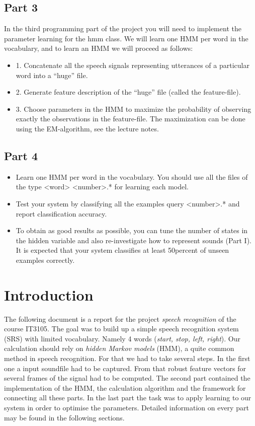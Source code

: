\documentclass[titlepage]{article}
\begin{document}
    \subsection{Part 3}
In the third programming part of the project you will need to implement the
parameter learning for the hmm class. We will learn one HMM per word in the
vocabulary, and to learn an HMM we will proceed as follows:
\begin{itemize}
\item 1. Concatenate all the speech signals representing utterances of a particular word into a “huge” ﬁle.
\item 2. Generate feature description of the “huge” ﬁle (called the feature-ﬁle).
\item 3. Choose parameters in the HMM to maximize the probability of observing exactly the observations in the feature-ﬁle. The maximization can be done using the EM-algorithm, see the lecture notes.
\end{itemize}

    \subsection{Part 4}
\begin{itemize}
\item Learn one HMM per word in the vocabulary. You should use all the ﬁles of the type <word> <number>.* for learning each model.
\item Test your system by classifying all the examples query <number>.* and report classiﬁcation accuracy.
\item To obtain as good results as possible, you can tune the number of states in the hidden variable and also re-investigate how to represent sounds (Part I). It is expected that your system classiﬁes at least 50percent of unseen examples correctly.
\end{itemize}






\section{Introduction}
The following document is a report for the project \emph{speech recognition} of the course IT3105. The goal was to build up a simple speech recognition system (SRS) with limited vocabulary. Namely 4 words (\emph{start, stop, left, right}). Our calculation should rely on \emph{hidden Markov models} (HMM), a quite common method in speech recognition. For that we had to take several steps. In the first one a input soundfile had to be captured. From that robust feature vectors for several frames of the signal had to be computed. The second part contained the implementation of the HMM, the calculation algorithm and the framework for connecting all these parts. In the last part the task was to apply learning to our system in order to optimise the parameters. Detailed information on every part may be found in the following sections.
\end{document}
